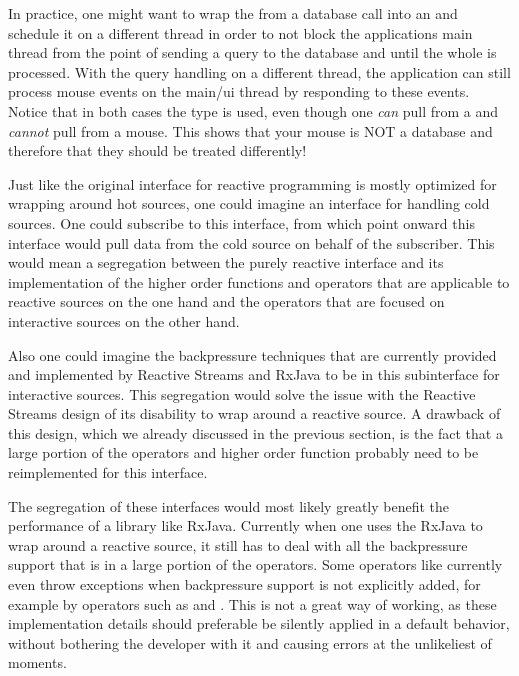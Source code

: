 In practice, one might want to wrap the  from a database call into an \obs and schedule it on a different thread in order to not block the applications main thread from the point of sending a query to the database and until the whole  is processed. With the query handling on a different thread, the application can still process mouse events on the main/ui thread by responding to these events. Notice that in both cases the \obs type is used, even though one \emph{can} pull from a  and \emph{cannot} pull from a mouse. This shows that your mouse is NOT a database and therefore that they should be treated differently!

Just like the original interface for reactive programming is mostly optimized for wrapping around hot sources, one could imagine an interface for handling cold sources. One could subscribe to this interface, from which point onward this interface would pull data from the cold source on behalf of the subscriber. This would mean a segregation between the purely reactive interface and its implementation of the higher order functions and operators that are applicable to reactive sources on the one hand and the operators that are focused on interactive sources on the other hand.

Also one could imagine the backpressure techniques that are currently provided and implemented by Reactive Streams and RxJava to be in this subinterface for interactive sources. This segregation would solve the issue with the Reactive Streams design of its disability to wrap around a reactive source. A drawback of this design, which we already discussed in the previous section, is the fact that a large portion of the operators and higher order function probably need to be reimplemented for this interface.

The segregation of these interfaces would most likely greatly benefit the performance of a library like RxJava. Currently when one uses the RxJava \obs to wrap around a reactive source, it still has to deal with all the backpressure support that is in a large portion of the operators. Some operators like  currently even throw exceptions when backpressure support is not explicitly added, for example by operators such as  and . This is not a great way of working, as these implementation details should preferable be silently applied in a default behavior, without bothering the developer with it and causing errors at the unlikeliest of moments.

